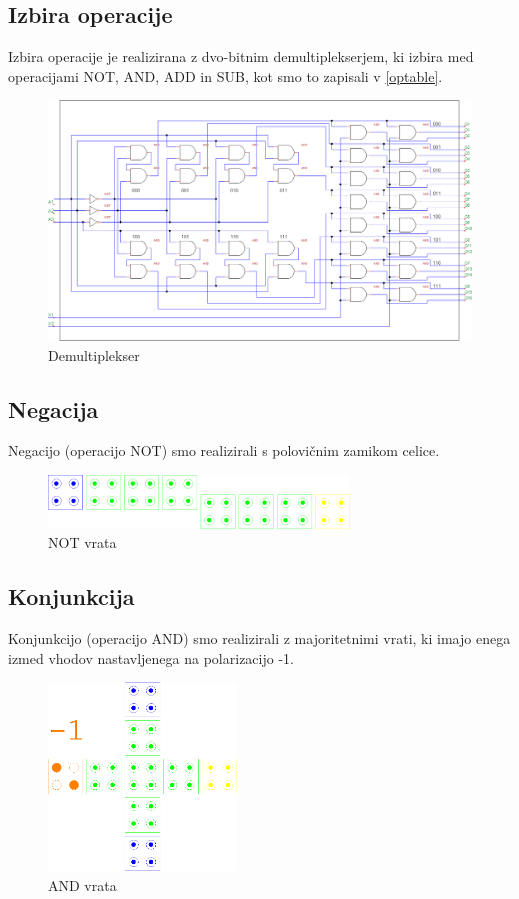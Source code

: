 \documentclass[seminar, slovene]{FRIreport}
\begin{document}
\subsection{Izbira operacije}
Izbira operacije je realizirana z dvo-bitnim demultiplekserjem, ki izbira med operacijami NOT, AND, ADD in SUB, kot smo to zapisali v \autoref{optable}.
\begin{figure}[htb]
\includegraphics[width=15cm]{vezja/img/demux}
\caption{Demultiplekser}
\label{demux}
\end{figure}
\pagebreak

\subsection{Negacija}
Negacijo (operacijo NOT) smo realizirali s polovičnim zamikom celice.
\begin{figure}[htb]
\begin{center}
\includegraphics[width=8cm]{qca/img/NOT}
\caption{NOT vrata}
\label{NOT}
\end{center}
\end{figure}

\subsection{Konjunkcija}
Konjunkcijo (operacijo AND) smo realizirali z majoritetnimi vrati, ki imajo enega izmed vhodov nastavljenega na polarizacijo -1.
\begin{figure}[htb]
\begin{center}
\includegraphics[width=5cm]{qca/img/AND}
\caption{AND vrata}
\label{AND}
\end{center}
\end{figure}
\end{document}
